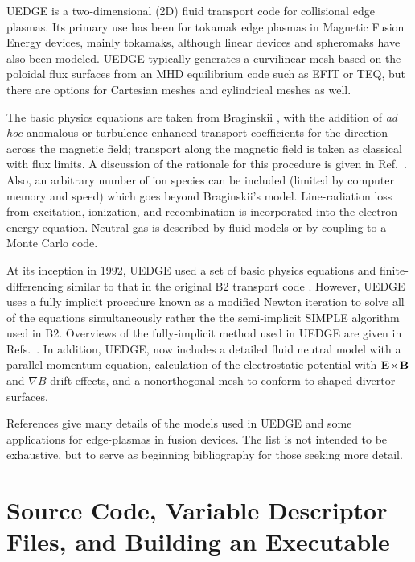 \documentclass [12pt]{article}
\def\exb{{\bf E \! \times \! B}}
\begin{document}
{\sf UEDGE} is a two-dimensional (2D) fluid transport code for collisional
edge plasmas.  Its primary use has been for tokamak edge plasmas in Magnetic
Fusion Energy devices, mainly tokamaks, although linear devices and spheromaks
have also been modeled.  {\sf UEDGE} typically generates a curvilinear mesh
based on the poloidal flux surfaces from an MHD equilibrium code such as {\sf
  EFIT} or {\sf TEQ}, but there are options for Cartesian meshes and
cylindrical meshes as well.

The basic physics equations are taken from Braginskii \cite{brag}, with the
addition of {\it ad hoc} anomalous or turbulence-enhanced transport
coefficients for the direction across the magnetic field; transport along the
magnetic field is taken as classical with flux limits.  A discussion of the
rationale for this procedure is given in Ref.~\cite{rog_ryu99}.  Also, an
arbitrary number of ion species can be included (limited by computer memory
and speed) which goes beyond Braginskii's model.  Line-radiation loss from
excitation, ionization, and recombination is incorporated into the electron
energy equation.  Neutral gas is described by fluid models or by coupling to a
Monte Carlo code.

At its inception in 1992, {\sf UEDGE} used a set of basic physics equations
and finite-differencing similar to that in the original {\sf B2} transport
code \cite{braams87,braams96}.  However, {\sf UEDGE} uses a fully implicit
procedure known as a modified Newton iteration to solve all of the equations
simultaneously rather the the semi-implicit {\sf SIMPLE} algorithm used in
{\sf B2}. Overviews of the fully-implicit method used in {\sf UEDGE} are given
in Refs.~\cite{brown86,saad96}. In addition, {\sf UEDGE}, now includes a
detailed fluid neutral model with a parallel momentum equation, calculation of
the electrostatic potential with $\exb$ and $\nabla B$ drift effects, and a
nonorthogonal mesh to conform to shaped divertor surfaces.  

References  give many details of the models used in {\sf
  UEDGE} and some applications for edge-plasmas in fusion devices.  The list
is not intended to be exhaustive, but to serve as beginning bibliography for
those seeking more detail.

\section{Source Code, Variable Descriptor Files, and Building an Executable}
\end{document}
